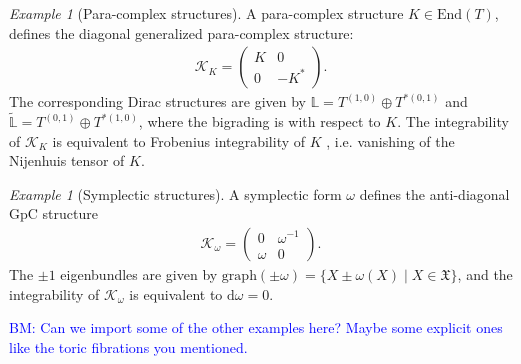 \documentclass{article}
\newcommand{\KK}{\mathcal{K}}
\newcommand{\XX}{\mathfrak{X}}
\newcommand{\id}{\mathbbm{1}}
\newcommand{\rd}{\mathrm{d}}
\newcommand{\Lb}{\mathbb{L}}
\newcommand{\Endo}{\text{End}}
\theoremstyle{definition}
\theoremstyle{remark}
\newtheorem{Ex}[theorem]{Example}
\def\brian{\textcolor{blue}{BM: }\textcolor{blue}}
\begin{document}
\begin{Ex}[Para-complex structures]
A para-complex structure $K\in \Endo(T)$, defines the diagonal generalized para-complex structure:
\begin{align*}
\KK_K=
\begin{pmatrix}
K & 0 \\
0 & -K^*
\end{pmatrix}.
\end{align*}
The corresponding Dirac structures are given by $\Lb=T^{(1,0)}\oplus T^{*(0,1)}$ and $\widetilde{\Lb}=T^{(0,1)}\oplus T^{*(1,0)}$, where the bigrading is with respect to $K$. The integrability of $\KK_K$ is equivalent to Frobenius integrability of $K$ , i.e. vanishing of the Nijenhuis tensor of $K$.
%

\end{Ex}

\begin{Ex}[Symplectic structures]\label{ex:GpC_sympl}
A symplectic form $\omega$ defines the anti-diagonal GpC structure
\begin{align*}
\KK_\omega=
\begin{pmatrix}
0 & \omega^{-1} \\
\omega & 0
\end{pmatrix}.
\end{align*}
The $\pm 1$ eigenbundles are given by $\text{graph}(\pm\omega)=\{X\pm\omega(X)\mid X\in \XX\}$, and the integrability of $\KK_\omega$ is equivalent to $\rd\omega=0$.
\end{Ex}

\brian{Can we import some of the other examples here?
Maybe some explicit ones like the toric fibrations you mentioned.}
\end{document}

